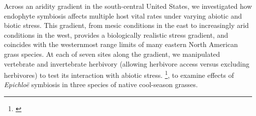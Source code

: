 \documentclass[12pt]{article}\usepackage[]{graphicx}\usepackage[dvipsnames]{xcolor}
\newcommand{\tom}[2]{{\color{red}{#1}}\footnote{\textit{\color{red}{#2}}}}
\begin{document}
Across an aridity gradient in the south-central United States, we investigated how endophyte symbiosis affects multiple host vital rates under varying abiotic and biotic stress. 
This gradient, from mesic conditions in the east to increasingly arid conditions in the west, provides a biologically realistic stress gradient, and coincides with the westernmost range limits of many eastern North American grass species. 
At each of seven sites along the gradient, we manipulated vertebrate and invertebrate herbivory (allowing herbivore access versus excluding herbivores) to test its interaction with abiotic stress.
\tom{We also manipulated endophyte presence, creating endophyte-free and endophyte-symbiotic individuals}{I would soften this, because based on the analysis we did it is only in AGHY that we can be confident that our E- are experimentally disinfected. So overall it was a mix of disinfected E- and naturally occurring E-. It will be important to provide those results in the supplement.}, to examine effects of \emph{Epichloë} symbiosis in three species of native cool-season grasses.
\end{document}
